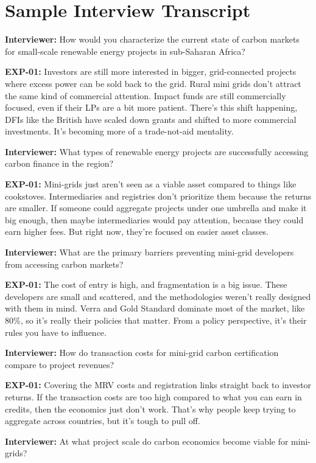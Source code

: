 \section{Sample Interview Transcript}
\label{app:transcript}
\textbf{Interviewer:} How would you characterize the current state of carbon markets for small-scale renewable energy projects in sub-Saharan Africa?

\textbf{EXP-01:} Investors are still more interested in bigger, grid-connected projects where excess power can be sold back to the grid. Rural mini grids don't attract the same kind of commercial attention. Impact funds are still commercially focused, even if their LPs are a bit more patient. There's this shift happening, DFIs like the British have scaled down grants and shifted to more commercial investments. It's becoming more of a trade-not-aid mentality.

\textbf{Interviewer:} What types of renewable energy projects are successfully accessing carbon finance in the region?

\textbf{EXP-01:} Mini-grids just aren't seen as a viable asset compared to things like cookstoves. Intermediaries and registries don't prioritize them because the returns are smaller. If someone could aggregate projects under one umbrella and make it big enough, then maybe intermediaries would pay attention, because they could earn higher fees. But right now, they're focused on easier asset classes.

\textbf{Interviewer:} What are the primary barriers preventing mini-grid developers from accessing carbon markets?

\textbf{EXP-01:} The cost of entry is high, and fragmentation is a big issue. These developers are small and scattered, and the methodologies weren't really designed with them in mind. Verra and Gold Standard dominate most of the market, like 80\%, so it's really their policies that matter. From a policy perspective, it's their rules you have to influence.

\textbf{Interviewer:} How do transaction costs for mini-grid carbon certification compare to project revenues?

\textbf{EXP-01:} Covering the MRV costs and registration links straight back to investor returns. If the transaction costs are too high compared to what you can earn in credits, then the economics just don't work. That's why people keep trying to aggregate across countries, but it's tough to pull off.

\textbf{Interviewer:} At what project scale do carbon economics become viable for mini-grids?

